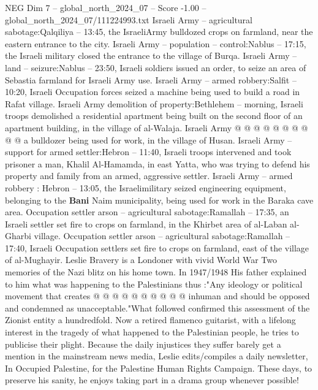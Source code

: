 \begin{textsample}{NEG Dim 7 – global\_north\_2024\_07 – Score -1.00 – global\_north\_2024\_07/111224993.txt}
Israeli Army -- agricultural sabotage:Qalqiliya -- 13:45, the IsraeliArmy bulldozed crops on farmland, near the eastern entrance to the city.
Israeli Army -- population -- control:Nablus -- 17:15, the Israeli military closed the entrance to the village of Burqa.
Israeli Army -- land -- seizure:Nablus -- 23:50, Israeli soldiers issued an order, to seize an area of Sebastia farmland for Israeli Army use.
Israeli Army -- armed robbery:Salfit -- 10:20, Israeli Occupation forces seized a machine being used to build a road in Rafat village.
Israeli Army demolition of property:Bethlehem -- morning, Israeli troops demolished a residential apartment being built on the second floor of an apartment building, in the village of al-Walaja.
Israeli Army @ @ @ @ @ @ @ @ @ @ a bulldozer being used for work, in the village of Husan.
Israeli Army -- support for armed settler:Hebron -- 11:40, Israeli troops intervened and took prisoner a man, Khalil Al-Hamamda, in east Yatta, who was trying to defend his property and family from an armed, aggressive settler.
Israeli Army -- armed robbery : Hebron -- 13:05, the Israelimilitary seized engineering equipment, belonging to the \textbf{Bani} Naim municipality, being used for work in the Baraka cave area.
Occupation settler arson -- agricultural sabotage:Ramallah -- 17:35, an Israeli settler set fire to crops on farmland, in the Khirbet area of al-Laban al-Gharbi village.
Occupation settler arson -- agricultural sabotage:Ramallah -- 17:40, Israeli Occupation settlers set fire to crops on farmland, east of the village of al-Mughayir.
Leslie Bravery is a Londoner with vivid World War Two memories of the Nazi blitz on his home town.
In 1947/1948 His father explained to him what was happening to the Palestinians thus :"Any ideology or political movement that creates @ @ @ @ @ @ @ @ @ @ inhuman and should be opposed and condemned as unacceptable."What followed confirmed this assessment of the Zionist entity a hundredfold.
Now a retired flamenco guitarist, with a lifelong interest in the tragedy of what happened to the Palestinian people, he tries to publicise their plight.
Because the daily injustices they suffer barely get a mention in the mainstream news media, Leslie edits/compiles a daily newsletter, In Occupied Palestine, for the Palestine Human Rights Campaign.
These days, to preserve his sanity, he enjoys taking part in a drama group whenever possible!

\end{textsample}
